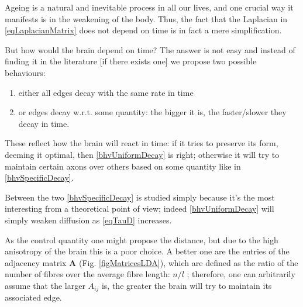 \documentclass{article}
\begin{document}
                Ageing is a natural and inevitable process in all our lives, and one crucial way it manifests is in the weakening of the body. Thus, the fact that the Laplacian in \eqref{eqLaplacianMatrix} does not depend on time is in fact a mere simplification.

                But how would the brain depend on time? The answer is not easy and instead of finding it in the literature [if there exists one] we propose two possible behaviours:

                \begin{enumerate}[
                    label=B\arabic*,  %
                    topsep=7.5pt,	  %
                    itemsep=-1pt,	  %
                    leftmargin=30pt,  %
                    rightmargin=20pt, %
                ]
                    \item\label{bhvUniformDecay} either all edges decay with the same rate in time
                    \item\label{bhvSpecificDecay} or edges decay w.r.t. some quantity: the bigger it is, the faster/slower they decay in time.
                \end{enumerate}

                These reflect how the brain will react in time: if it tries to preserve its form, deeming it optimal, then \ref{bhvUniformDecay} is right; otherwise it will try to maintain certain axons over others based on some quantity like in \ref{bhvSpecificDecay}.

                Between the two \ref{bhvSpecificDecay} is studied simply because it's the most interesting from a theoretical point of view; indeed \ref{bhvUniformDecay} will simply weaken diffusion as \eqref{eqTauD} increases.

                As the control quantity one might propose the distance, but due to the high anisotropy of the brain this is a poor choice. A better one are the entries of the adjacency matrix $\mathbf A$ (Fig. \ref{figMatricesLDA}), which are defined as the ratio of the number of fibres over the average fibre length: $n/l$ \cite{BRCI,BRCII,BRCIII}; therefore, one can arbitrarily assume that the larger $A_{ij}$ is, the greater the brain will try to maintain its associated edge.
\end{document}
